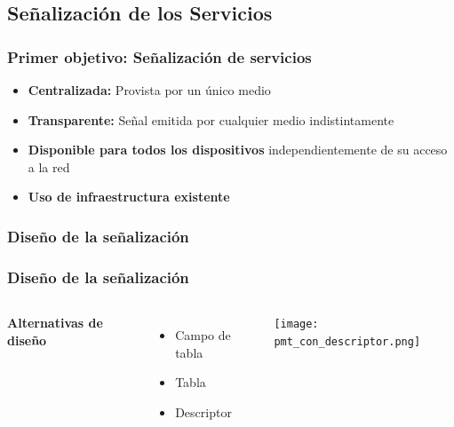 \documentclass[a4paper,11pt]{beamer}
\begin{document}
	\subsection{Señalización de los Servicios}
	\begin{frame}
		\frametitle{Primer objetivo: Señalización de servicios}
		\begin{itemize}
			\item \textbf{Centralizada:} Provista por un único medio
			\item \textbf{Transparente:} Señal emitida por cualquier medio indistintamente
			\item \textbf{Disponible para todos los dispositivos} independientemente de su acceso a la red
			\item \textbf{Uso de infraestructura existente}
		\end{itemize}
	\end{frame}

		\subsubsection{Diseño de la señalización}


		\begin{frame}
			\frametitle{Diseño de la señalización}
			\begin{columns}
				\textbf{Alternativas de diseño}
				\begin{itemize}
					\item Campo de tabla
					\item Tabla
					\item Descriptor
				\end{itemize}
				\begin{center}
					\texttt{[image: pmt\_con\_descriptor.png]}
				\end{center}
			\end{columns}
		\end{frame}
\end{document}
